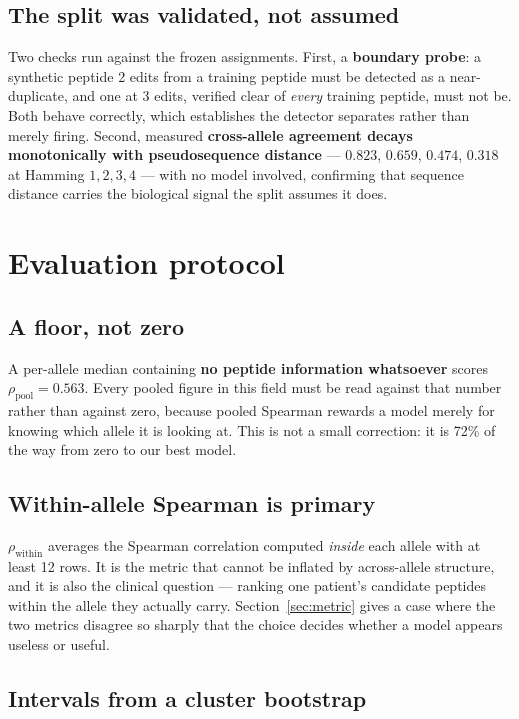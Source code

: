 \documentclass[11pt,a4paper]{article}
\newcommand{\rhop}{\rho_{\text{pool}}}
\newcommand{\rhow}{\rho_{\text{within}}}
\begin{document}
\subsection{The split was validated, not assumed}

Two checks run against the frozen assignments. First, a \textbf{boundary probe}: a synthetic
peptide 2 edits from a training peptide must be detected as a near-duplicate, and one at 3 edits,
verified clear of \emph{every} training peptide, must not be. Both behave correctly, which
establishes the detector separates rather than merely firing. Second, measured
\textbf{cross-allele agreement decays monotonically with pseudosequence distance} --- $0.823$,
$0.659$, $0.474$, $0.318$ at Hamming $1,2,3,4$ --- with no model involved, confirming that
sequence distance carries the biological signal the split assumes it does.

\section{Evaluation protocol}
\label{sec:eval}

\subsection{A floor, not zero}

A per-allele median containing \textbf{no peptide information whatsoever} scores
$\rhop = 0.563$. Every pooled figure in this field must be read against that number rather than
against zero, because pooled Spearman rewards a model merely for knowing which allele it is
looking at. This is not a small correction: it is 72\% of the way from zero to our best model.

\subsection{Within-allele Spearman is primary}

$\rhow$ averages the Spearman correlation computed \emph{inside} each allele with at least 12
rows. It is the metric that cannot be inflated by across-allele structure, and it is also the
clinical question --- ranking one patient's candidate peptides within the allele they actually
carry. Section~\ref{sec:metric} gives a case where the two metrics disagree so sharply that the
choice decides whether a model appears useless or useful.

\subsection{Intervals from a cluster bootstrap}
\end{document}

